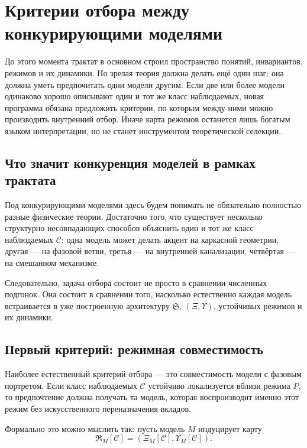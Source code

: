 \documentclass[12pt,a4paper]{article}
\begin{document}
\section{Критерии отбора между конкурирующими моделями}

До этого момента трактат в основном строил пространство понятий, инвариантов, режимов и их динамики. Но зрелая теория должна делать ещё один шаг: она должна уметь предпочитать одни модели другим. Если две или более модели одинаково хорошо описывают один и тот же класс наблюдаемых, новая программа обязана предложить критерии, по которым между ними можно производить внутренний отбор. Иначе карта режимов останется лишь богатым языком интерпретации, но не станет инструментом теоретической селекции.

\subsection{Что значит конкуренция моделей в рамках трактата}

Под конкурирующими моделями здесь будем понимать не обязательно полностью разные физические теории. Достаточно того, что существует несколько структурно несовпадающих способов объяснить один и тот же класс наблюдаемых \(\mathcal{C}\): одна модель может делать акцент на каркасной геометрии, другая --- на фазовой ветви, третья --- на внутренней канализации, четвёртая --- на смешанном механизме.

Следовательно, задача отбора состоит не просто в сравнении численных подгонок. Она состоит в сравнении того, насколько естественно каждая модель встраивается в уже построенную архитектуру \(\mathfrak{S}\), \((\Xi,\Upsilon)\), устойчивых режимов и их динамики.

\subsection{Первый критерий: режимная совместимость}

Наиболее естественный критерий отбора --- это совместимость модели с фазовым портретом. Если класс наблюдаемых \(\mathcal{C}\) устойчиво локализуется вблизи режима \(P\), то предпочтение должна получать та модель, которая воспроизводит именно этот режим без искусственного переназначения вкладов.

Формально это можно мыслить так: пусть модель \(M\) индуцирует карту
\begin{equation}
\mathfrak{R}_M[\mathcal{C}] = (\Xi_M[\mathcal{C}],\Upsilon_M[\mathcal{C}]).
\end{equation}
\end{document}
